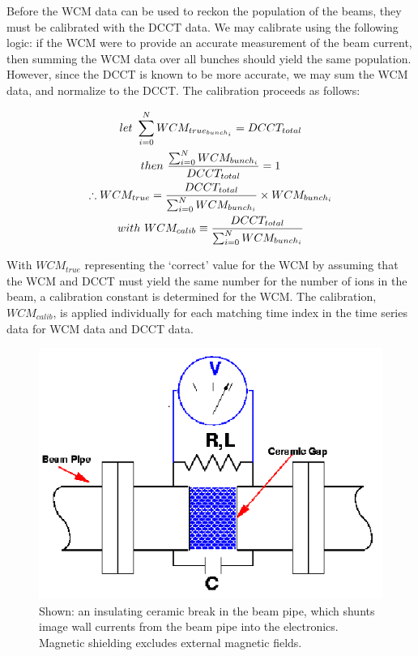 Before the WCM data can be used to reckon the population of the beams, they must
be calibrated with the DCCT data. We may calibrate using the following logic: if
the WCM were to provide an accurate measurement of the beam current, then
summing the WCM data over all bunches should yield the same population. However,
since the DCCT is known to be more accurate, we may sum the WCM data, and
normalize to the DCCT. The calibration proceeds as follows:

\begin{gather}
  let~\sum_{i=0}^{N} WCM_{true_{bunch_i}} = DCCT_{total} \\
  then~{{\sum_{i=0}^{N} WCM_{bunch_i}}\over{DCCT_{total}}} = 1 \\
  \therefore WCM_{true} =
  {{DCCT_{total}}\over{\sum_{i=0}^{N}WCM_{bunch_i}}}\times WCM_{bunch_i} \\
  with~WCM_{calib} \equiv {{DCCT_{total}}\over{\sum_{i=0}^{N}WCM_{bunch_i}}}
\end{gather}

{\noindent}With $WCM_{true}$ representing the `correct' value for the WCM by
assuming that the WCM and DCCT must yield the same number for the number of ions
in the beam, a calibration constant is determined for the WCM. The calibration,
$WCM_{calib}$, is applied individually for each matching time index in the time
series data for WCM data and DCCT data.

\begin{figure}[ht]
  \begin{center}
    \includegraphics[width=0.75\linewidth]{./figures/wcm_schematic_cartoon}
    \caption{ 
      Shown: an insulating ceramic break in the beam pipe, which shunts
      image wall currents from the beam pipe into the electronics. Magnetic
      shielding excludes external magnetic fields.~\cite{KawallFocus2004} 
    }
    \label{fig:wcm_schematic_cartoon}
  \end{center}
\end{figure}


